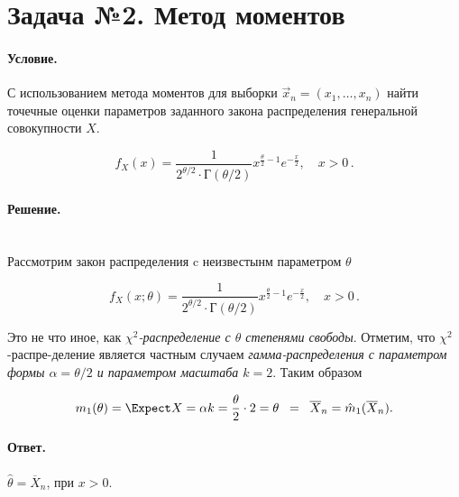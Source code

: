
\section{Задача №2. Метод моментов}

\paragraph{Условие.} С использованием метода моментов для выборки $\vec{x}_n = (x_1, \dots, x_n)$ найти точечные оценки параметров заданного закона распределения генеральной совокупности $X$.

\[
    f_X (x) = \frac{1}{2^{\theta/2} \cdot \textsf{Г} (\theta/2)} x^{\frac{\theta}{2} - 1} e^{-\frac{x}{2}}, \quad x > 0\,.
\]

\paragraph{Решение.}\hfill\\

\noindent
Рассмотрим закон распределения c неизвестынм параметром $\theta$

\[
    f_X (x; \theta) = \frac{1}{2^{\theta/2} \cdot \textsf{Г} (\theta/2)} x^{\frac{\theta}{2} - 1} e^{-\frac{x}{2}}, \quad x > 0\,.
\]

\noindent
Это не что иное, как \emph{$\chi^2$-распределение с $\theta$ степенями свободы}. Отметим, что $\chi^2$-распре-деление является частным случаем \emph{гамма-распределения с параметром формы $\alpha = \theta/2$ и параметром масштаба $k = 2$}. Таким образом

\[
    m_1(\theta) = \Expect X = \alpha k = \frac{\theta}{2} \cdot 2 = \theta \;\; = \;\; \overline{X}_n = \hat{m}_1(\overline{X}_n).
\]

\paragraph{Ответ.} $\hat\theta = \overline{X}_n$, при $x > 0$.